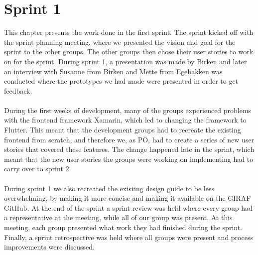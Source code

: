 \chapter{Sprint 1}
This chapter presents the work done in the first sprint.
The sprint kicked off with the sprint planning meeting, where we presented the vision and goal for the sprint to the other groups.
The other groups then chose their user stories to work on for the sprint.
During sprint 1, a presentation was made by Birken and later an interview with Susanne from Birken and Mette from Egebakken was conducted where the prototypes we had made were presented in order to get feedback.
\\\\
During the first weeks of development, many of the groups experienced problems with the frontend framework Xamarin, which led to changing the framework to Flutter.
This meant that the development groups had to recreate the existing frontend from scratch, and therefore we, as PO, had to create a series of new user stories that covered these features.
The change happened late in the sprint, which meant that the new user stories the groups were working on implementing had to carry over to sprint 2.
\\\\
During sprint 1 we also recreated the existing design guide to be less overwhelming, by making it more concise and making it available on the GIRAF GitHub.
At the end of the sprint a sprint review was held where every group had a representative at the meeting, while all of our group was present.
At this meeting, each group presented what work they had finished during the sprint.
Finally, a sprint retrospective was held where all groups were present and process improvements were discussed.
